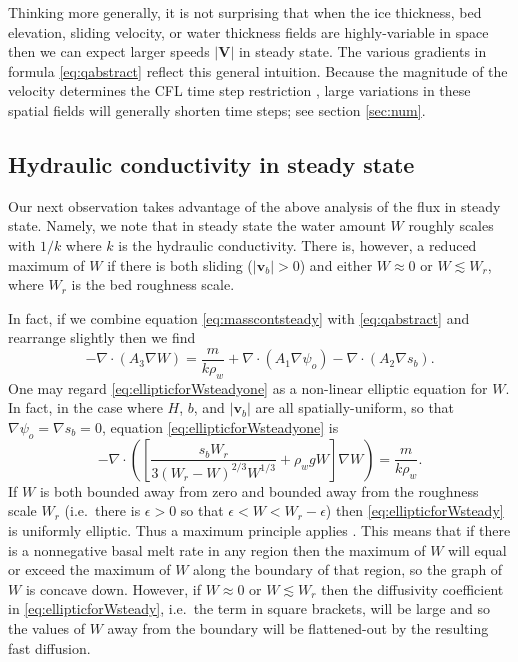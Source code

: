 \documentclass[gmd]{copernicus}   %
\newcommand\bv{\mathbf{v}}
\newcommand\bV{\mathbf{V}}
\newcommand{\Div}{\nabla\cdot}
\newcommand\eps{\epsilon}
\newcommand{\grad}{\nabla}
\begin{document}
Thinking more generally, it is not surprising that when the ice thickness, bed elevation, sliding velocity, or water thickness fields are highly-variable in space then we can expect larger speeds $|\bV|$ in steady state.  The various gradients in formula \eqref{eq:qabstract} reflect this general intuition.  Because the magnitude of the velocity determines the CFL time step restriction \citep{MortonMayers}, large variations in these spatial fields will generally shorten time steps; see section \ref{sec:num}.


\subsection{Hydraulic conductivity in steady state}  Our next observation takes advantage of the above analysis of the flux in steady state.  Namely, we note that in steady state the water amount $W$ roughly scales with $1/k$ where $k$ is the hydraulic conductivity.  There is, however, a reduced maximum of $W$ if there is both sliding ($|\bv_b|>0$) and either $W\approx 0$ or $W\lesssim W_r$, where $W_r$ is the bed roughness scale.

In fact, if we combine equation \eqref{eq:masscontsteady} with \eqref{eq:qabstract} and rearrange slightly then we find
\begin{equation}
-\Div \left(A_3 \grad W\right) = \frac{m}{k \rho_w} + \Div \left(A_1 \grad \psi_o\right) - \Div \left(A_2 \grad s_b\right).  \label{eq:ellipticforWsteadyone}
\end{equation}
One may regard \eqref{eq:ellipticforWsteadyone} as a non-linear elliptic equation for $W$.  In fact, in the case where $H$, $b$, and $|\bv_b|$ are all spatially-uniform, so that $\grad \psi_o = \grad s_b = 0$, equation \eqref{eq:ellipticforWsteadyone} is
\small
\begin{equation}
-\Div \left(\left[\frac{s_b W_r}{3 (W_r - W)^{2/3} W^{1/3}} + \rho_w g W\right] \grad W\right) = \frac{m}{k \rho_w}.  \label{eq:ellipticforWsteady}
\end{equation}
\normalsize
If $W$ is both bounded away from zero and bounded away from the roughness scale $W_r$ (i.e.~there is $\eps>0$ so that $\eps < W < W_r-\eps$) then \eqref{eq:ellipticforWsteady} is uniformly elliptic.  Thus a maximum principle applies \citep{Evans}.  This means that if there is a nonnegative basal melt rate in any region then the maximum of $W$ will equal or exceed the maximum of $W$ along the boundary of that region, so the graph of $W$ is concave down.  However, if $W\approx 0$  or $W\lesssim W_r$ then the diffusivity coefficient in \eqref{eq:ellipticforWsteady}, i.e.~the term in square brackets, will be large and so the values of $W$ away from the boundary will be flattened-out by the resulting fast diffusion.
\end{document}

